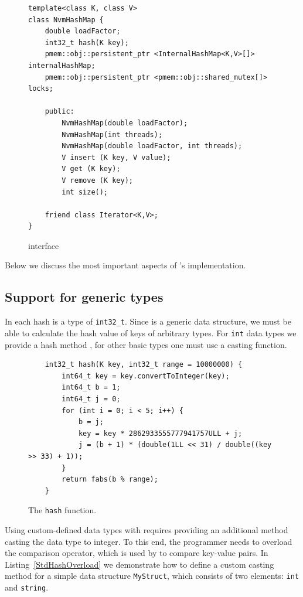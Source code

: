 \begin{figure}[ht] 
\renewcommand{\figurename}{Listing}
    \begin{lstlisting}
template<class K, class V> 
class NvmHashMap {
    double loadFactor;
    int32_t hash(K key);
    pmem::obj::persistent_ptr <InternalHashMap<K,V>[]> internalHashMap;
    pmem::obj::persistent_ptr <pmem::obj::shared_mutex[]> locks;
    
    public: 
        NvmHashMap(double loadFactor);
        NvmHashMap(int threads);
        NvmHashMap(double loadFactor, int threads);
        V insert (K key, V value);
        V get (K key);
        V remove (K key);
        int size();
    
    friend class Iterator<K,V>;
}
    \end{lstlisting}
\label{NvmHashMap}
\caption{\NvmHashMap interface}
\end{figure}

    Below we discuss the most important aspects of \PHT's implementation.
    
\subsection{Support for generic types} 

    In \NvmHashMap each hash is a type of \texttt{int32\_t}. 
    Since \NvmHashMap is a generic data structure, we must be able to calculate the hash value of keys of arbitrary types.
    For \texttt{int} data types we provide a hash method \cite{Hashing}, for other basic types one must use a casting function. 
    
    \begin{figure}[ht]
\renewcommand{\figurename}{Listing}
\begin{lstlisting}
    int32_t hash(K key, int32_t range = 10000000) {
        int64_t key = key.convertToInteger(key);
        int64_t b = 1;
        int64_t j = 0;
        for (int i = 0; i < 5; i++) {
            b = j;
            key = key * 2862933555777941757ULL + j;
            j = (b + 1) * (double(1LL << 31) / double((key >> 33) + 1));
        }
        return fabs(b % range);
    }
\end{lstlisting}
\caption{The \texttt{hash} function.}
\label{Hash}
\end{figure}

    Using custom-defined data types with \NvmHashMap requires providing an additional method casting the data type to integer.
    To this end, the programmer needs to overload the comparison operator, which is used by \NvmHashMap to compare key-value pairs. 
    In Listing~\ref{StdHashOverload} we demonstrate how to define a custom casting method for a simple data structure \texttt{MyStruct}, which consists of two elements: \texttt{int} and \texttt{string}. 
    
